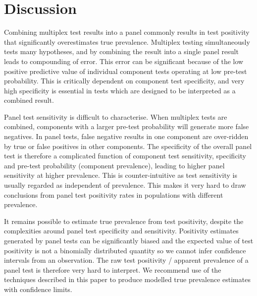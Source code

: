 \documentclass[10pt,letterpaper]{article}
\begin{document}
\section*{Discussion}

Combining multiplex test results into a panel commonly results in test positivity that significantly overestimates true prevalence. Multiplex testing simultaneously tests many hypotheses, and by combining the result into a single panel result leads to compounding of error. This error can be significant because of the low positive predictive value of individual component tests operating at low pre-test probability. This is critically dependent on component test specificity, and very high specificity is essential in tests which are designed to be interpreted as a combined result.

Panel test sensitivity is difficult to characterise. When multiplex tests are combined, components with a larger pre-test probability will generate more false negatives. In panel tests, false negative results in one component are over-ridden by true or false positives in other components. The specificity of the overall panel test is therefore a complicated function of component test sensitivity, specificity and pre-test probability (component prevalence), leading to higher panel sensitivity at higher prevalence. This is counter-intuitive as test sensitivity is usually regarded as independent of prevalence. This makes it very hard to draw conclusions from panel test positivity rates in populations with different prevalence.

It remains possible to estimate true prevalence from test positivity, despite the complexities around panel test specificity and sensitivity. Positivity estimates generated by panel tests can be significantly biased and the expected value of test positivity is not a binomially distributed quantity so we cannot infer confidence intervals from an observation. The raw test positivity / apparent prevalence of a panel test is therefore very hard to interpret. We recommend use of the techniques described in this paper to produce modelled true prevalence estimates with confidence limits.
\end{document}
